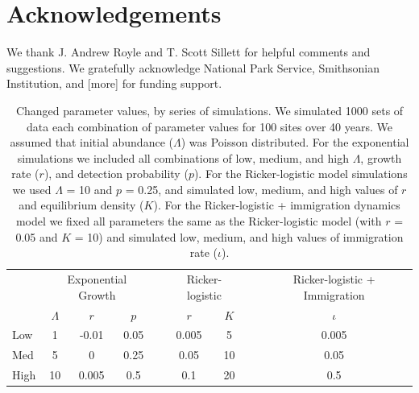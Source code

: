 \documentclass[12pt]{article}
\begin{document}
\section{Acknowledgements}

We thank J. Andrew Royle and T. Scott Sillett for helpful
comments and suggestions. We gratefully acknowledge National Park 
Service, Smithsonian Institution, and [more] for funding support.




\newpage



\begin{table}[t]
  \centering
\caption{Changed parameter values, by series of simulations.  We
simulated 1000 sets of data each combination of parameter values
for 100 sites over 40 years.  We assumed that initial abundance
($\Lambda$) was Poisson distributed.  For the exponential 
simulations we included all combinations of low, medium, and
high $\Lambda$, growth rate ($r$), and detection probability ($p$).
For the Ricker-logistic model simulations we used $\Lambda$ = 10 and $p$ = 0.25, and
simulated low, medium, and high values of $r$ and equilibrium density ($K$).
For the Ricker-logistic + immigration dynamics model we fixed all parameters the
same as the Ricker-logistic model (with $r$ = 0.05 and $K$ = 10) and
simulated low, medium, and high values of immigration rate ($\iota$).}  
\begin{tabular}{lcccccccc}
    \hline
    & \multicolumn{3}{c}{Exponential Growth} && \multicolumn{2}{c}{Ricker-logistic} &&
    Ricker-logistic + Immigration \\
    \cline{2-4}     \cline{6-7}    \cline{9-9}
& $\Lambda$ & $r$ & $p$ && $r$  & $K$ && $\iota$  \\    
\hline
    Low	        &1	&-0.01	&0.05	&&0.005	 &5	&&0.005  \\
    Med	        &5	&0	&0.25	&&0.05	&10	&&0.05   \\
    High		 &10 &0.005	&0.5	&&0.1	&20	&&0.5    \\
    \hline
  \end{tabular}
\end{table}

\newpage
\end{document}
